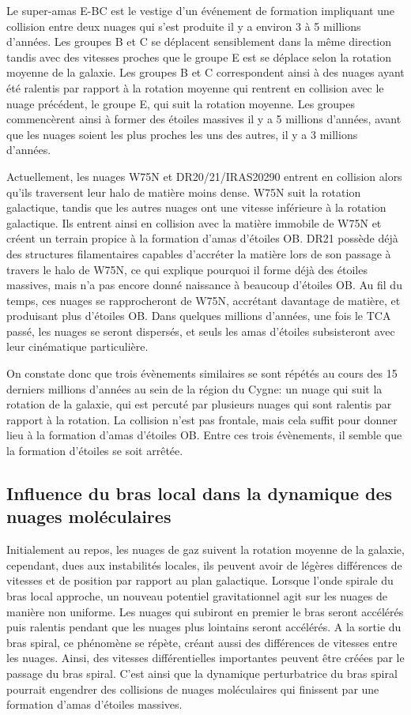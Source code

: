 \documentclass[a4paper, 11pt]{article}
\begin{document}
	Le super-amas E-BC est le vestige d'un événement de formation impliquant une collision entre deux nuages qui s'est produite il y a environ 3 à 5 millions d'années. Les groupes B et C se déplacent sensiblement dans la même direction tandis avec des vitesses proches que le groupe E est se déplace selon la rotation moyenne de la galaxie. Les groupes B et C correspondent ainsi à des nuages ayant été ralentis par rapport à la rotation moyenne qui rentrent en collision avec le nuage précédent, le groupe E, qui suit la rotation moyenne. Les groupes commencèrent ainsi à former des étoiles massives il y a 5 millions d'années, avant que les nuages soient les plus proches les uns des autres, il y a 3 millions d'années.
	
	Actuellement, les nuages W75N et DR20/21/IRAS20290 entrent en collision alors qu’ils traversent leur halo de matière moins dense. W75N suit la rotation galactique, tandis que les autres nuages ont une vitesse inférieure à la rotation galactique. Ils entrent ainsi en collision avec la matière immobile de W75N et créent un terrain propice à la formation d’amas d’étoiles OB. DR21 possède déjà des structures filamentaires capables d'accréter la matière lors de son passage à travers le halo de W75N, ce qui explique pourquoi il forme déjà des étoiles massives, mais n'a pas encore donné naissance à beaucoup d'étoiles OB. Au fil du temps, ces nuages se rapprocheront de W75N, accrétant davantage de matière, et produisant plus d'étoiles OB. Dans quelques millions d'années, une fois le TCA passé, les nuages se seront dispersés, et seuls les amas d'étoiles subsisteront avec leur cinématique particulière.
	
	On constate donc que trois évènements similaires se sont répétés au cours des 15 derniers millions d'années au sein de la région du Cygne: un nuage qui suit la rotation de la galaxie, qui est percuté par plusieurs nuages qui sont ralentis par rapport à la rotation. La collision n'est pas frontale, mais cela suffit pour donner lieu à la formation d'amas d'étoiles OB. Entre ces trois évènements, il semble que la formation d'étoiles se soit arrêtée.
	
	\subsection{Influence du bras local dans la dynamique des nuages moléculaires}
	Initialement au repos, les nuages de gaz suivent la rotation moyenne de la galaxie, cependant, dues aux instabilités locales, ils peuvent avoir de légères différences de vitesses et de position par rapport au plan galactique. Lorsque l'onde spirale du bras local approche, un nouveau potentiel gravitationnel agit sur les nuages de manière non uniforme. Les nuages qui subiront en premier le bras seront accélérés puis ralentis pendant que les nuages plus lointains seront accélérés. A la sortie du bras spiral, ce phénomène se répète, créant aussi des différences de vitesses entre les nuages. Ainsi, des vitesses différentielles importantes peuvent être créées par le passage du bras spiral. C'est ainsi que la dynamique perturbatrice du bras spiral pourrait engendrer des collisions de nuages moléculaires qui finissent par une formation d'amas d'étoiles massives.
	
\end{document}
